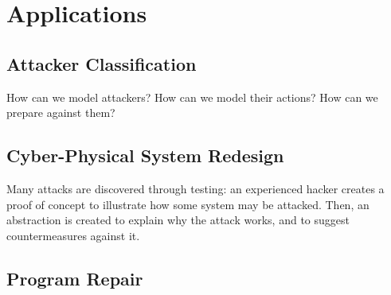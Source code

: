 \section{Applications}
\subsection{Attacker Classification}
How can we model attackers? How can we model their actions? How can we prepare against them?
\subsection{Cyber-Physical System Redesign}
Many attacks are discovered through testing: an experienced hacker creates a proof of concept to illustrate how some system may be attacked. Then, an abstraction is created to explain why the attack works, and to suggest countermeasures against it. 
\subsection{Program Repair}









